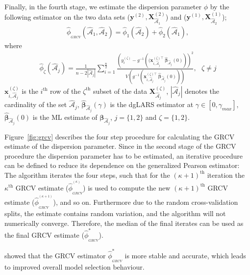 Finally, in the fourth stage, we estimate the dispersion parameter $\phi$ by the following estimator on the two data sets ($\bm{y}^{(2)}, \bm{X}^{(2)}_{\hat{\mathcal{A}}_1}$) and ($\bm{y}^{(1)}, \bm{X}^{(1)}_{\hat{\mathcal{A}}_2}$);
\begin{align}
\hat{\phi}_{_{GRCV}}(\hat{\mathcal{A}}_1,\hat{\mathcal{A}}_2) = {\hat{\phi}_{1}(\hat{\mathcal{A}}_2)+\hat{\phi}_{2}(\hat{\mathcal{A}}_1)},
\label{eq:fan3}
\end{align}
where
\begin{align}
\hat{\phi}_{\zeta}(\hat{\mathcal{A}}_j) = \frac{1}{{n}-2 | \hat{\mathcal{A}}_j|} \sum^{\frac{n}{2}}_{i=1}\frac{\left( y^{(\zeta)}_i-g^{-1}\left( (\bm{x}_{i,\hat{\mathcal{A}}_j}^{(\zeta)\top} \ \hat{\boldsymbol{\beta}}_{\hat{\mathcal{A}}_j}(0) \right) \right) ^2}{V\left( g^{-1}\left( \bm{x}_{i,\hat{\mathcal{A}}_j}^{(\zeta) \top} \  \hat{\boldsymbol{\beta}}_{\hat{\mathcal{A}}_j}(0)\right) \right) }, \ \ \ \zeta \neq j
\label{eq:fan}
\end{align}
$\bm{x}_{i,\hat{\mathcal{A}}_j}^{(\zeta)}$ is the $i^{\text{th}}$ row of the $\zeta^{\text{th}}$ subset of the data $ \bm{X}^{(\zeta)}_{\hat{\mathcal{A}}_j}$, $|\hat{\mathcal{A}}_j|$ denotes the cardinality of the set $\hat{\mathcal{A}}_j$, $\hat{\boldsymbol{\beta}}_{\hat{\mathcal{A}}_j}(\gamma) $ is the dgLARS estimator at $\gamma \in [ 0,\gamma_{max}]$, $\hat{\boldsymbol{\beta}}_{\hat{\mathcal{A}}_j}(0)$ is the ML estimate of ${\boldsymbol{\beta}}_{\hat{\mathcal{A}}_j}$, $j=\{1, 2 \}$ and $\zeta=\{1, 2 \}$. 


Figure~\ref{fig:grcv} describes the four step procedure for calculating the GRCV estimate of the dispersion parameter. Since in the second stage of the GRCV procedure the dispersion parameter has to be estimated, an iterative procedure can be defined to reduce its dependence on the generalized Pearson estimator: The algorithm iterates the four steps, such that for the $(\kappa+1)^{\text{th}}$ iteration the $\kappa^{\text{th}}$ GRCV estimate ($\hat{\phi}^{ ^{(\kappa)}}_{_{GRCV}}$) is used to compute the new $(\kappa+1)^{\text{th}}$ GRCV estimate ($\hat{\phi}^{ ^{(\kappa+1)}}_{_{GRCV}}$), and so on. Furthermore due to the random cross-validation splits, the estimate contains random variation, and the algorithm will not numerically converge. Therefore, the median of the final  iterates can be used as the final GRCV estimate ($\hat{\phi}^*_{_{GRCV}}$).

\cite{pazira} showed that the GRCV estimator $\hat{\phi}^*_{_{GRCV}}$ is more stable and accurate, which leads to improved overall model selection behaviour.  

